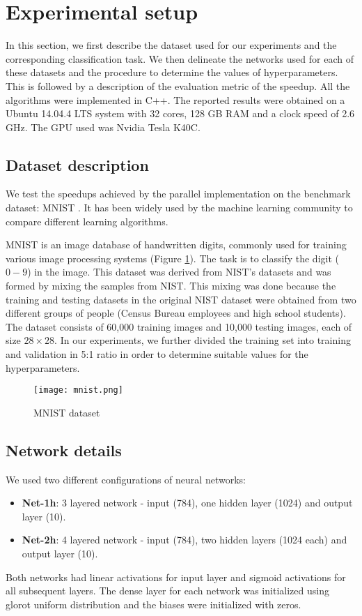 \section{Experimental setup}
\label{Exp}

In this section, we first describe the dataset used for our experiments and the corresponding classification task. We then delineate the networks used for each of these datasets and the procedure to determine the values of hyperparameters. This is followed by a description of the evaluation metric of the speedup. All the algorithms were implemented in C++. The reported results were obtained on a Ubuntu 14.04.4 LTS system with 32 cores, 128 GB RAM and a clock speed of 2.6 GHz. The GPU used was Nvidia Tesla K40C.

\subsection{Dataset description}
\label{sub:data_desc}

We test the speedups achieved by the parallel implementation on the benchmark dataset: MNIST \cite{mnist_Lecun}. It has been widely used by the machine learning community to compare different learning algorithms. 

MNIST is an image database of handwritten digits, commonly used for training various image processing systems (Figure \ref{fig:mnist}). The task is to classify the digit ($0-9$) in the image. This dataset was derived from NIST's datasets and was formed by mixing the samples from NIST. This mixing was done because the training and testing datasets in the original NIST dataset were obtained from two different groups of people (Census Bureau employees and high school students). The dataset consists of 60,000 training images and 10,000 testing images, each of size $28\times 28$. In our experiments, we further divided the training set into training and validation in 5:1 ratio in order to determine suitable values for the hyperparameters.

\begin{figure}
	\centering
    \texttt{[image: mnist.png]}
  	\caption{MNIST dataset}
    \label{fig:mnist}
\end{figure}

\subsection{Network details}
\label{sub:net_det}

We used two different configurations of neural networks:
\begin{itemize}
\item \textbf{Net-1h}: 3 layered network - input (784), one hidden layer (1024) and output layer (10).
\item \textbf{Net-2h}: 4 layered network - input (784), two hidden layers (1024 each) and output layer (10).
\end{itemize}
Both networks had linear activations for input layer and sigmoid activations for all subsequent layers.
The dense layer for each network was initialized using glorot uniform distribution \cite{Glorot2010} and the biases were initialized with zeros.

